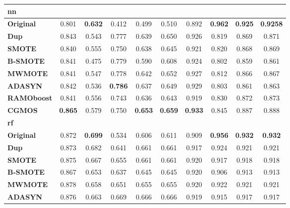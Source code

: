 \documentclass{iitthesis}
\begin{document}
\begin{table}[]
\begin{center}
{\begin{tabular}{lccccccccc}
\hline                    
\multicolumn{1}{l}{\textbf{nn}} & & \multicolumn{4}{c}{} & \multicolumn{4}{c}{}  \\               
\hline                     
\multicolumn{1}{l}{\textbf{Original}} & 0.801 & \textbf{0.632} & 0.412 & 0.499 & 0.510 & 0.892 & \textbf{0.962} & \textbf{0.925} & \textbf{0.9258}  \\ 
\multicolumn{1}{l}{\textbf{Dup}} & 0.843 & 0.543 & 0.777 & 0.639 & 0.650 & 0.926 & 0.819 & 0.869 & 0.871  \\ 
\multicolumn{1}{l}{\textbf{SMOTE}} & 0.840 & 0.555 & 0.750 & 0.638 & 0.645 & 0.921 & 0.820 & 0.868 & 0.869  \\ 
\multicolumn{1}{l}{\textbf{B-SMOTE}} & 0.841 & 0.475 & 0.779 & 0.590 & 0.608 & 0.924 & 0.802 & 0.859 & 0.861  \\ 
\multicolumn{1}{l}{\textbf{MWMOTE}} & 0.841 & 0.547 & 0.778 & 0.642 & 0.652 & 0.927 & 0.812 & 0.866 & 0.867  \\ 
\multicolumn{1}{l}{\textbf{ADASYN}} & 0.842 & 0.536 & \textbf{0.786} & 0.637 & 0.649 & 0.929 & 0.803 & 0.861 & 0.863  \\ 
\multicolumn{1}{l}{\textbf{RAMOboost}} & 0.841 & 0.556 & 0.743 & 0.636 & 0.643 & 0.919 & 0.830 & 0.872 & 0.873  \\
\multicolumn{1}{l}{\textbf{CGMOS}} & \textbf{0.865} & 0.579 & 0.750 & \textbf{0.653} & \textbf{0.659} & \textbf{0.933} & 0.845 & 0.887 & 0.888  \\ 
\hline 
\multicolumn{1}{l}{\textbf{rf}} & & \multicolumn{4}{c}{} & \multicolumn{4}{c}{}  \\               
\hline 
\multicolumn{1}{l}{\textbf{Original}} & 0.872 & \textbf{0.699} & 0.534 & 0.606 & 0.611 & 0.909 & \textbf{0.956} & \textbf{0.932} & \textbf{0.932}  \\ 
\multicolumn{1}{l}{\textbf{Dup}} & 0.873 & 0.682 & 0.641 & 0.661 & 0.661 & 0.917 & 0.924 & 0.921 & 0.921  \\
\multicolumn{1}{l}{\textbf{SMOTE}} & 0.875 & 0.667 & 0.655 & 0.661 & 0.661 & 0.920 & 0.917 & 0.918 & 0.918  \\ 
\multicolumn{1}{l}{\textbf{B-SMOTE}} & 0.867 & 0.653 & 0.637 & 0.645 & 0.645 & 0.920 & 0.906 & 0.913 & 0.913  \\
\multicolumn{1}{l}{\textbf{MWMOTE}} & 0.878 & 0.658 & 0.651 & 0.655 & 0.655 & 0.920 & 0.922 & 0.921 & 0.921  \\
\multicolumn{1}{l}{\textbf{ADASYN}} & 0.876 & 0.663 & 0.669 & 0.666 & 0.666 & 0.919 & 0.915 & 0.917 & 0.917  \\ 

\end{tabular}}
\end{center}
\end{table}
\end{document}

